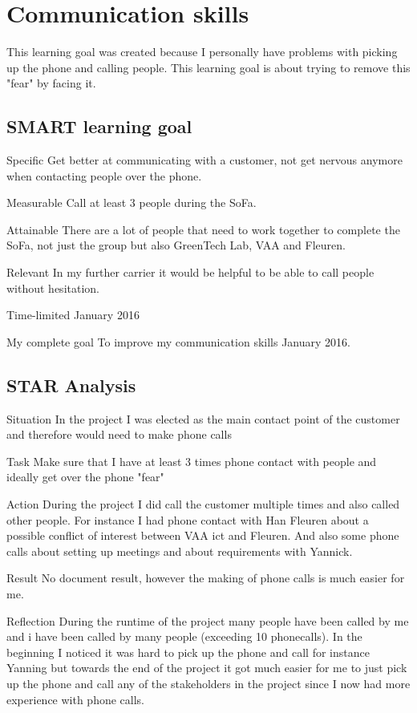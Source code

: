 \documentclass[12pt]{article}
\begin{document}
	\section{Communication skills}
	This learning goal was created because I personally have problems with picking up the phone and calling people. This learning goal is about trying to remove this "fear" by facing it.
	
	\subsection{SMART learning goal}
	\begin{SMART}
	    \item[Specific] Get better at communicating with a customer, not get nervous anymore when contacting people over the phone.
	    \item[Measurable] Call at least 3 people during the SoFa.
	    \item[Attainable] There are a lot of people that need to work together to complete the SoFa, not just the group but also GreenTech Lab, VAA and Fleuren.
	    \item[Relevant] In my further carrier it would be helpful to be able to call people without hesitation.
	    \item[Time-limited] January 2016
	    \item[My complete goal] To improve my communication skills January 2016.
	\end{SMART}
	
	\subsection{STAR Analysis}
	\begin{STAR}
	    \item[Situation] In the project I was elected as the main contact point of the customer and therefore would need to make phone calls
	    \item[Task] Make sure that I have at least 3 times phone contact with people and ideally get over the phone "fear" 
	    \item[Action] During the project I did call the customer multiple times and also called other people. For instance I had phone contact with Han Fleuren about a possible conflict of interest between VAA ict and Fleuren. And also some phone calls about setting up meetings and about requirements with Yannick.
	    \item[Result]
	    No document result, however the making of phone calls is much easier for me.
	    \item[Reflection]
	    During the runtime of the project many people have been called by me and i have been called by many people (exceeding 10 phonecalls). In the beginning I noticed it was hard to pick up the phone and call for instance Yanning but towards the end of the project it got much easier for me to just pick up the phone and call any of the stakeholders in the project since I now had more experience with phone calls.
	\end{STAR}
	
\end{document}
